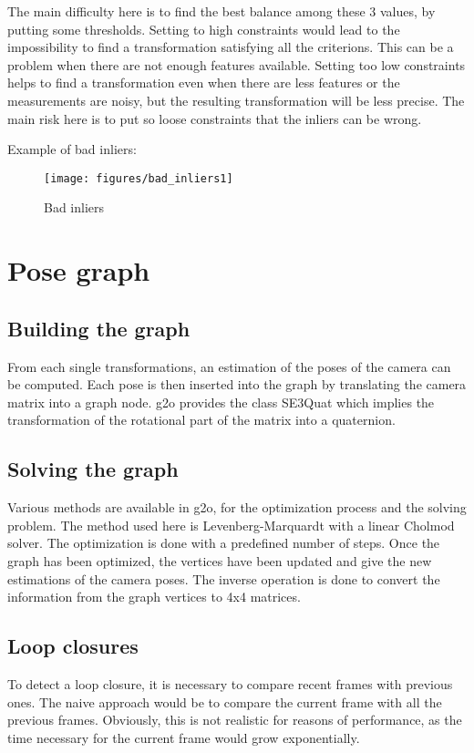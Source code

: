The main difficulty here is to find the best balance among these 3 values, by putting some thresholds. Setting to high constraints would lead to the impossibility to find a transformation satisfying all the criterions. This can be a problem when there are not enough features available. Setting too low constraints helps to find a transformation even when there are less features or the measurements are noisy, but the resulting transformation will be less precise. The main risk here is to put so loose constraints that the inliers can be wrong.

Example of bad inliers:

\begin{figure}[h]
\centering
\texttt{[image: figures/bad\_inliers1]}
\caption{Bad inliers}
\end{figure}

\chapter{Pose graph}
\section{Building the graph}

From each single transformations, an estimation of the poses of the camera can be computed. Each pose is then inserted into the graph by translating the camera matrix into a graph node. g2o provides the class SE3Quat which implies the transformation of the rotational part of the matrix into a quaternion.

\section{Solving the graph}

Various methods are available in g2o, for the optimization process and the solving problem. The method used here is Levenberg-Marquardt with a linear Cholmod solver. The optimization is done with a predefined number of steps. Once the graph has been optimized, the vertices have been updated and give the new estimations of the camera poses. The inverse operation is done to convert the information from the graph vertices to 4x4 matrices.

\section{Loop closures}

To detect a loop closure, it is necessary to compare recent frames with previous ones. The naive approach would be to compare the current frame with all the previous frames. Obviously, this is not realistic for reasons of performance, as the time necessary for the current frame would grow exponentially.

